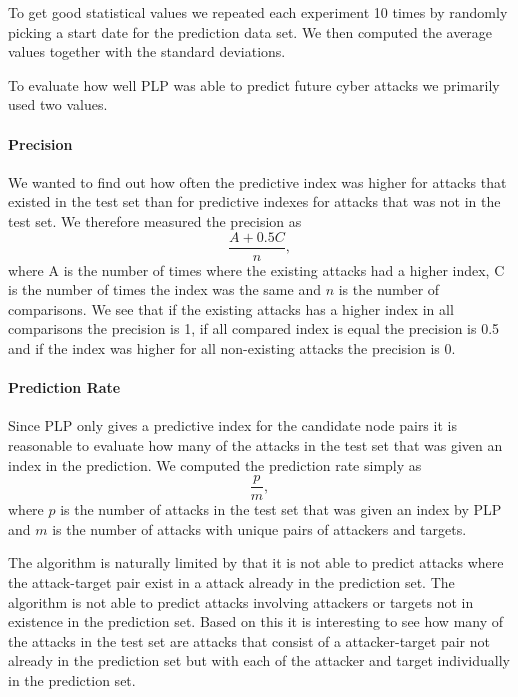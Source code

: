 To get good statistical values we repeated each experiment 10 times by randomly picking a start date for the prediction data set. We then computed the average values together with the standard deviations.

To evaluate how well PLP was able to predict future cyber attacks we primarily used two values. 
\paragraph{Precision}
We wanted to find out how often the predictive index was higher for attacks that existed in the test set than for predictive indexes for attacks that was not in the test set. We therefore measured the precision as
$$
  \frac{A+0.5C}{n},
$$
where A is the number of times where the existing attacks had a higher index, C is the number of times the index was the same and $n$ is the number of comparisons. We see that if the existing attacks has a higher index in all comparisons the precision is 1, if all compared index is equal the precision is 0.5 and if the index was higher for all non-existing attacks the precision is 0.

\paragraph{Prediction Rate}
Since PLP only gives a predictive index for the candidate node pairs it is reasonable to evaluate how many of the attacks in the test set that was given an index in the prediction. We computed the prediction rate simply as
$$
  \frac{p}{m},
$$
where $p$ is the number of attacks in the test set that was given an index by PLP and $m$ is the number of attacks with unique pairs of attackers and targets.

The algorithm is naturally limited by that it is not able to predict attacks where the attack-target pair exist in a attack already in the prediction set. The algorithm is not able to predict attacks involving attackers or targets not in existence in the prediction set. Based on this it is interesting to see how many of the attacks in the test set are attacks that consist of a attacker-target pair not already in the prediction set but with each of the attacker and target individually in the prediction set.
